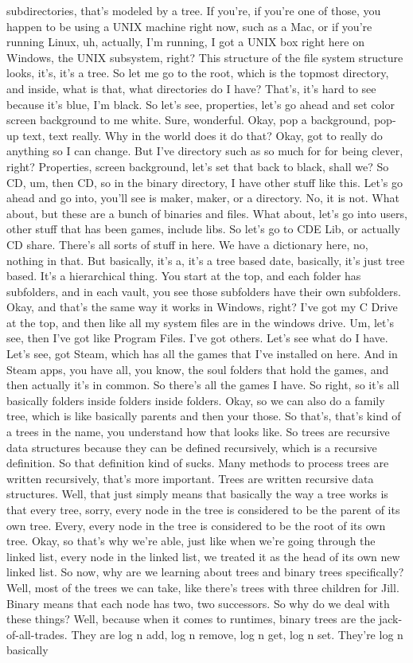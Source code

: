 subdirectories, that's modeled by a tree. If you're, if you're one of those, you happen to be using a UNIX machine right now, such as a Mac, or if you're running Linux, uh, actually, I'm running, I got a UNIX box right here on Windows, the UNIX subsystem, right? This structure of the file system structure looks, it's, it's a tree. So let me go to the root, which is the topmost directory, and inside, what is that, what directories do I have? That's, it's hard to see because it's blue, I'm black. So let's see, properties, let's go ahead and set color screen background to me white. Sure, wonderful. Okay, pop a background, pop-up text, text really. Why in the world does it do that? Okay, got to really do anything so I can change. But I've directory such as so much for for being clever, right? Properties, screen background, let's set that back to black, shall we? So CD, um, then CD, so in the binary directory, I have other stuff like this. Let's go ahead and go into, you'll see is maker, maker, or a directory. No, it is not. What about, but these are a bunch of binaries and files. What about, let's go into users, other stuff that has been games, include libs. So let's go to CDE Lib, or actually CD share. There's all sorts of stuff in here. We have a dictionary here, no, nothing in that. But basically, it's a, it's a tree based date, basically, it's just tree based. It's a hierarchical thing. You start at the top, and each folder has subfolders, and in each vault, you see those subfolders have their own subfolders. Okay, and that's the same way it works in Windows, right? I've got my C Drive at the top, and then like all my system files are in the windows drive. Um, let's see, then I've got like Program Files. I've got others. Let's see what do I have. Let's see, got Steam, which has all the games that I've installed on here. And in Steam apps, you have all, you know, the soul folders that hold the games, and then actually it's in common. So there's all the games I have. So right, so it's all basically folders inside folders inside folders. Okay, so we can also do a family tree, which is like basically parents and then your those. So that's, that's kind of a trees in the name, you understand how that looks like. So trees are recursive data structures because they can be defined recursively, which is a recursive definition. So that definition kind of sucks. Many methods to process trees are written recursively, that's more important. Trees are written recursive data structures. Well, that just simply means that basically the way a tree works is that every tree, sorry, every node in the tree is considered to be the parent of its own tree. Every, every node in the tree is considered to be the root of its own tree. Okay, so that's why we're able, just like when we're going through the linked list, every node in the linked list, we treated it as the head of its own new linked list. So now, why are we learning about trees and binary trees specifically? Well, most of the trees we can take, like there's trees with three children for Jill. Binary means that each node has two, two successors. So why do we deal with these things? Well, because when it comes to runtimes, binary trees are the jack-of-all-trades. They are log n add, log n remove, log n get, log n set. They're log n basically 